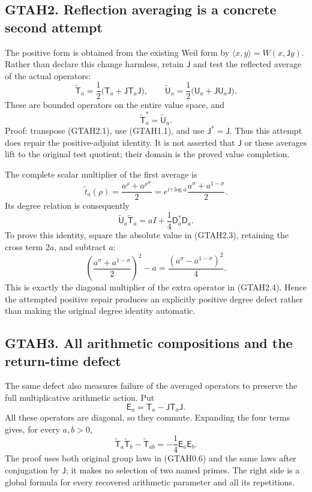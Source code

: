 \subsection{GTAH2. Reflection averaging is a concrete second
attempt}\label{gtah2.-reflection-averaging-is-a-concrete-second-attempt}

The positive form is obtained from the existing Weil form by
\(\langle x,y\rangle=W(x,\mathsf Jy)\). Rather than declare this change
harmless, retain \(\mathsf J\) and test the reflected average of the
actual operators: \[
\widetilde{\mathsf T}_a
=\frac12\bigl(\mathsf T_a+\mathsf J\mathsf T_a\mathsf J\bigr),
\qquad
\widetilde{\mathsf U}_a
=\frac12\bigl(\mathsf U_a+\mathsf J\mathsf U_a\mathsf J\bigr).
\tag{GTAH2.1}
\] These are bounded operators on the entire value space, and \[
\widetilde{\mathsf T}_a^*=\widetilde{\mathsf U}_a.
\tag{GTAH2.2}
\] Proof: transpose (GTAH2.1), use (GTAH1.1), and use
\(\mathsf J^*=\mathsf J\). Thus this attempt does repair the
positive-adjoint identity. It is not asserted that \(\mathsf J\) or
these averages lift to the original test quotient; their domain is the
proved value completion.

The complete scalar multiplier of the first average is \[
\widetilde t_a(\rho)
=\frac{a^\rho+a^{\rho^\#}}2
=e^{i\gamma\log a}\frac{a^\sigma+a^{1-\sigma}}2.
\tag{GTAH2.3}
\] Its degree relation is consequently \[
\boxed{\widetilde{\mathsf U}_a\widetilde{\mathsf T}_a
=aI+\frac14\mathsf D_a^*\mathsf D_a.}
\tag{GTAH2.4}
\] To prove this identity, square the absolute value in (GTAH2.3),
retaining the cross term \(2a\), and subtract \(a\): \[
\left(\frac{a^\sigma+a^{1-\sigma}}2\right)^2-a
=\frac{(a^\sigma-a^{1-\sigma})^2}{4}.
\tag{GTAH2.5}
\] This is exactly the diagonal multiplier of the extra operator in
(GTAH2.4). Hence the attempted positive repair produces an explicitly
positive degree defect rather than making the original degree identity
automatic.

\subsection{GTAH3. All arithmetic compositions and the return-time
defect}\label{gtah3.-all-arithmetic-compositions-and-the-return-time-defect}

The same defect also measures failure of the averaged operators to
preserve the full multiplicative arithmetic action. Put \[
\mathsf E_a=\mathsf T_a-\mathsf J\mathsf T_a\mathsf J.
\tag{GTAH3.1}
\] All these operators are diagonal, so they commute. Expanding the four
terms gives, for every \(a,b>0\), \[
\boxed{\widetilde{\mathsf T}_a\widetilde{\mathsf T}_b
-\widetilde{\mathsf T}_{ab}
=-\frac14\mathsf E_a\mathsf E_b.}
\tag{GTAH3.2}
\] The proof uses both original group laws in (GTAH0.6) and the same
laws after conjugation by \(\mathsf J\); it makes no selection of two
named primes. The right side is a global formula for every recovered
arithmetic parameter and all its repetitions.

